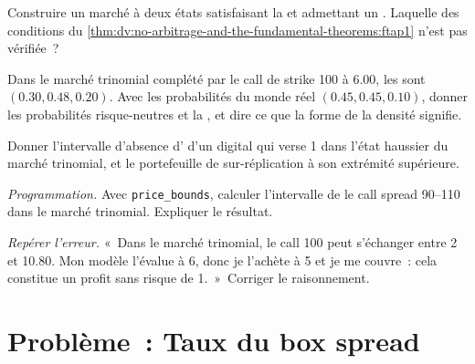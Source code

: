 \begin{exercise}[$\star\star$]\label{exo:dv:no-arbitrage-and-the-fundamental-theorems:4}
Construire un marché à deux états satisfaisant la  et admettant un
. Laquelle des conditions du
\cref{thm:dv:no-arbitrage-and-the-fundamental-theorems:ftap1} n'est pas vérifiée~?
\end{exercise}

\begin{exercise}[$\star\star$]\label{exo:dv:no-arbitrage-and-the-fundamental-theorems:5}
Dans le marché trinomial complété par le call de strike 100 à 6.00, les  sont
$(0.30, 0.48, 0.20)$. Avec les probabilités du monde réel $(0.45, 0.45, 0.10)$, donner
les probabilités risque-neutres et la , et dire ce que la
forme de la densité signifie.
\end{exercise}

\begin{exercise}[$\star\star$]\label{exo:dv:no-arbitrage-and-the-fundamental-theorems:6}
Donner l'intervalle d'absence d' d'un digital qui verse 1 dans l'état haussier du
marché trinomial, et le portefeuille de sur-réplication à son extrémité supérieure.
\end{exercise}

\begin{exercise}[$\star\star\star$]\label{exo:dv:no-arbitrage-and-the-fundamental-theorems:7}
\emph{Programmation.} Avec \texttt{price\_bounds}, calculer l'intervalle de
le call spread 90--110 dans le marché trinomial. Expliquer le résultat.
\end{exercise}

\begin{exercise}[$\star\star\star$]\label{exo:dv:no-arbitrage-and-the-fundamental-theorems:8}
\emph{Repérer l'erreur.} «~Dans le marché trinomial, le call 100 peut s'échanger
entre 2 et 10.80. Mon modèle l'évalue à 6, donc je l'achète à 5 et je me couvre~: cela
constitue un profit sans risque de 1.~»~Corriger le raisonnement.
\end{exercise}

\section{Problème~: Taux du box spread}

